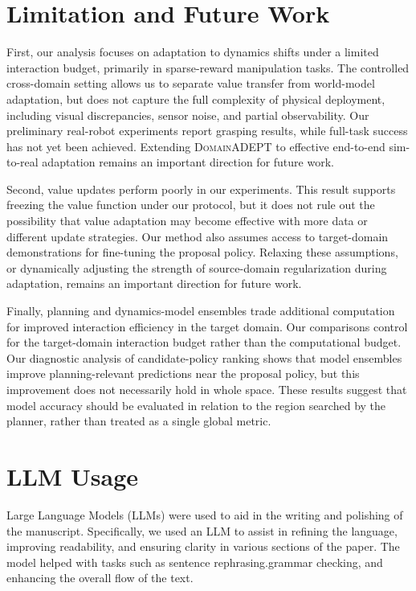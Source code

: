 \documentclass{article} %
\newcommand{\DomainADEPT}{\textsc{DomainADEPT}\xspace}
\begin{document}

\section{Limitation and Future Work}

First, our analysis focuses on adaptation to dynamics shifts under a limited interaction budget, primarily in sparse-reward manipulation tasks. The controlled cross-domain setting allows us to separate value transfer from world-model adaptation, but does not capture the full complexity of physical deployment, including visual discrepancies, sensor noise, and partial observability. Our preliminary real-robot experiments report grasping results, while full-task success has not yet been achieved. Extending \DomainADEPT to effective end-to-end sim-to-real adaptation remains an important direction for future work.

Second, value updates perform poorly in our experiments. This result supports freezing the value function under our protocol, but it does not rule out the possibility that value adaptation may become effective with more data or different update strategies. Our method also assumes access to target-domain demonstrations for fine-tuning the proposal policy. Relaxing these assumptions, or dynamically adjusting the strength of source-domain regularization during adaptation, remains an important direction for future work.

Finally, planning and dynamics-model ensembles trade additional computation for improved interaction efficiency in the target domain. Our comparisons control for the target-domain interaction budget rather than the computational budget. Our diagnostic analysis of candidate-policy ranking shows that model ensembles improve planning-relevant predictions near the proposal policy, but this improvement does not necessarily hold in whole space. These results suggest that model accuracy should be evaluated in relation to the region searched by the planner, rather than treated as a single global metric.

\section{LLM Usage}

Large Language Models (LLMs) were used to aid in the writing and polishing of the manuscript. Specifically, we used an LLM to assist in refining the language, improving readability, and ensuring clarity in various sections of the paper. The model helped with tasks such as sentence rephrasing.grammar checking, and enhancing the overall flow of the text.
\end{document}

